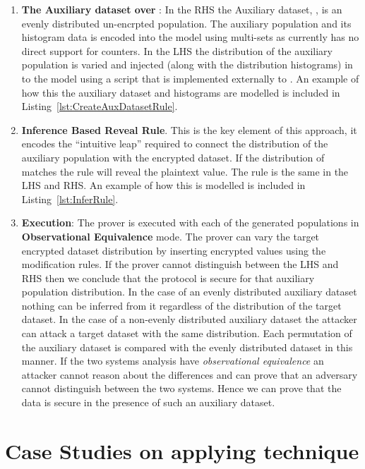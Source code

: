 \documentclass[runningheads]{llncs}
\begin{document}
\begin{enumerate}[label=(\Alph*)]
\item \textbf{The Auxiliary dataset \aux{} over \auxSpace}:
In the RHS the Auxiliary dataset, \auxsecure{}, is an evenly distributed un-encrpted population.  The auxiliary population and its histogram data is encoded into the model using \tamarin{} multi-sets as \tamarin{} currently has no direct support for counters. 
In the LHS the distribution of the auxiliary population is varied and injected (along with the distribution histograms) in to the model using a script that is implemented externally to \tamarin{}.
An example of how this the auxiliary dataset and histograms are modelled is included in Listing~\ref{lst:CreateAuxDatasetRule}.
\item\textbf{Inference Based Reveal Rule}. This is the key element of this approach, it encodes the ``intuitive leap'' required to connect the distribution of the auxiliary population with the encrypted dataset. If the distribution of \aux{} matches \enc{} the rule will reveal the plaintext value. The rule is the same in the LHS and RHS. An example of how this is modelled is included in Listing~\ref{lst:InferRule}.
\item \textbf{Execution}:
The \tamarin{} prover is executed with each of the generated \aux{} populations in \textbf{Observational Equivalence} mode. The prover can vary the target encrypted dataset distribution by inserting encrypted values using the modification rules. If the prover cannot distinguish between the LHS and RHS then we conclude that the protocol is secure for that auxiliary population distribution.  In the case of an evenly distributed auxiliary dataset nothing can be inferred from it regardless of the distribution of the target dataset. In the case of a non-evenly distributed auxiliary dataset the attacker can attack a target dataset with the same distribution. Each permutation of the auxiliary dataset is compared with the evenly distributed dataset in this manner. If the two systems analysis have \textit{observational equivalence} an attacker cannot reason about the differences and \tamarin{} can prove that an adversary cannot distinguish between the two systems. Hence we can prove that the data is secure in the presence of such an auxiliary dataset.

\end{enumerate}


 
\section{Case Studies on applying technique}
\end{document}
